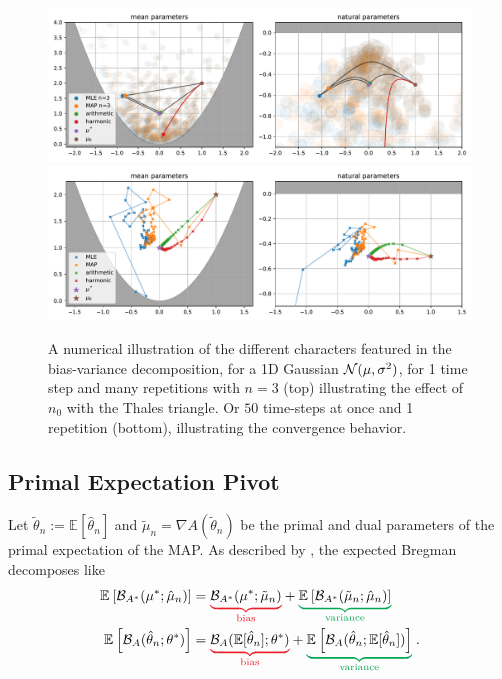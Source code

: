 \documentclass{article}
\newcommand*{\expect}[2][]{\ensuremath{\mathbb{E}_{#1} \left[ #2 \right] }} %
\newcommand{\logpart}{A}
\newcommand{\bregman}{\cB_\logpart}
\newcommand{\bregmanconj}{\cB_{\logpart^*}}
\newcommand{\natp}{\theta}
\newcommand{\MAPm}{\hat \mu_n}
\newcommand{\MAPt}{\hat \natp_n}
\begin{document}
\begin{figure}[ht]
	\centering
	\includegraphics[width=\textwidth]{figs/thales/numerical_schema_n=3.pdf}
	\includegraphics[width=\textwidth]{figs/2d/gaussian_convergence.pdf}
	\caption{A numerical illustration of the different characters featured in the bias-variance decomposition, for a 1D Gaussian ${\mathcal N}(\mu, \sigma^2)$, for 1 time step  and many repetitions with $n=3$ (top) illustrating the effect of $n_0$ with the Thales triangle. Or $50$ time-steps at once and 1 repetition (bottom), illustrating the convergence behavior.}
	\label{fig:bias-variance-numerical}
\end{figure}


\subsection{Primal Expectation Pivot}
Let $\tilde \theta_n := \expect{\hat \theta_n}$ and $\tilde \mu_n = \nabla \logpart(\tilde \theta_n )$ be the primal and dual parameters of the primal expectation of the MAP.
As described by \citet[Theorem 0.1]{pfau2013generalized}, the  expected Bregman decomposes like
\begin{align}
	\expect{\bregmanconj(\mu^* ; \hat \mu_n)} 
	&= \bias{\bregmanconj(\mu^* ; \tilde \mu_n)}
	+ \variance{\expect{\bregmanconj(\tilde \mu_n ; \MAPm)}} \\
	\expect{\bregman(\MAPt; \natp^*)} 
	&= \bias{\bregman(\E[\MAPt]; \natp^*)}
	+ \variance{\expect{\bregman(\MAPt; \E[\MAPt])}}  \; .
	\label{eq:primal_pivot}
\end{align}
\end{document}
